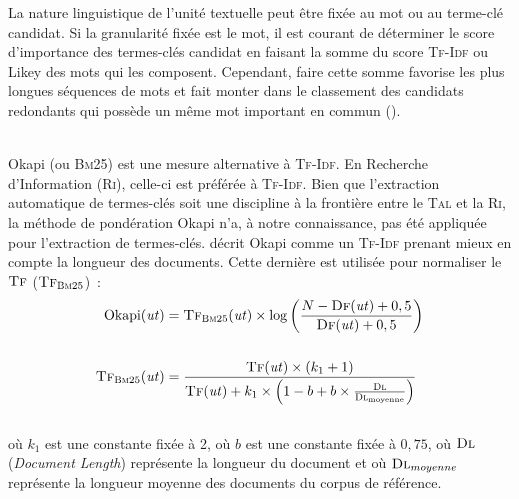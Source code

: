         La nature linguistique de l'unité textuelle peut être fixée au mot ou au
        terme-clé candidat. Si la granularité fixée est le mot, il est courant
        de déterminer le score d'importance des termes-clés candidat en faisant
        la somme du score \textsc{Tf-Idf} ou Likey des mots qui les composent.
        Cependant, faire cette somme favorise les plus longues séquences de mots
        et fait monter dans le classement des candidats redondants qui possède
        un même mot important en commun ().

        ~\\Okapi (ou \textsc{Bm}25) \cite{robertson1999okapi} est une mesure
        alternative à \textsc{Tf-Idf}. En Recherche d'Information (\textsc{Ri}),
        celle-ci est préférée à \textsc{Tf-Idf}. Bien que l'extraction
        automatique de termes-clés soit une discipline à la frontière entre le
        \textsc{Tal} et la \textsc{Ri}, la méthode de pondération Okapi n'a, à
        notre connaissance, pas été appliquée pour l'extraction de termes-clés.
         décrit Okapi comme un \textsc{Tf-Idf}
        prenant mieux en compte la longueur des documents. Cette dernière est
        utilisée pour normaliser le $\textsc{Tf}$
        ($\textsc{Tf}_{\textsc{Bm}25}$)~:
        \begin{align}
          \text{Okapi}(\text{\textit{ut}}) &= \textsc{Tf}_{\textsc{Bm}25}(\text{\textit{ut}}) \times \log\left(\frac{N - \textsc{Df}(\text{\textit{ut}}) + 0,5}{\textsc{Df}(\text{\textit{ut}}) + 0,5}\right) \label{math:okapi}\\
          \notag\\
          \textsc{Tf}_{\textsc{Bm}25}(\text{\textit{ut}}) &= \frac{\textsc{Tf}(\text{\textit{ut}}) \times (k_1 + 1)}{\textsc{Tf}(\text{\textit{ut}}) + k_1 \times \left(1 - b + b \times \frac{\textsc{Dl}}{\textsc{Dl}_{\text{moyenne}}}\right)} \label{math:tf_bm25}
        \end{align}\\
        où $k_1$ est une constante fixée à 2, où $b$ est une constante fixée à
        $0,75$, où $\textsc{Dl}$ (\textit{Document Length}) représente la
        longueur du document et où $\textsc{Dl}_{moyenne}$ représente la
        longueur moyenne des documents du corpus de référence.

